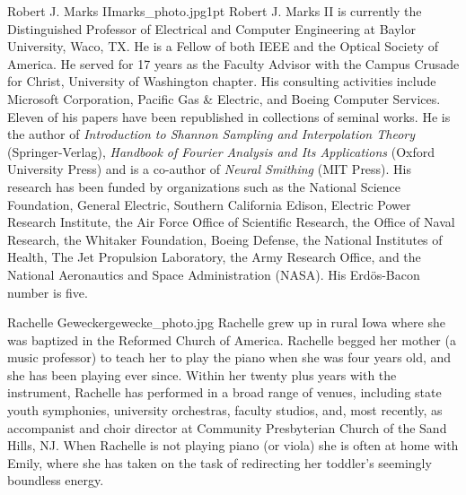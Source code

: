 \begin{authorbio}{Robert J. Marks II}{marks_photo.jpg}{1pt}
Robert J. Marks II is currently the Distinguished Professor of Electrical and Computer Engineering 
at Baylor University, Waco, TX. He is a Fellow of both IEEE and the Optical Society
of America. He served for 17 years as the Faculty Advisor with the Campus Crusade for Christ,
University of Washington chapter. His consulting activities include Microsoft Corporation, Pacific
Gas \& Electric, and Boeing Computer Services. Eleven of his papers have been republished in collections 
of seminal works. He is the author of \textit{Introduction to Shannon Sampling and Interpolation
Theory} (Springer-Verlag), \textit{Handbook of Fourier Analysis and Its Applications} (Oxford University
Press) and is a co-author of \textit{Neural Smithing} (MIT Press). His research has been funded by organizations 
such as the National Science Foundation, General Electric, Southern California Edison,
Electric Power Research Institute, the Air Force Office of Scientific Research, the Office of Naval
Research, the Whitaker Foundation, Boeing Defense, the National Institutes of Health, The Jet
Propulsion Laboratory, the Army Research Office, and the National Aeronautics and Space Administration 
(NASA). 
His Erd\"{o}s-Bacon
number is five.
\end{authorbio}

\begin{authorbio}{Rachelle Gewecke}{rgewecke_photo.jpg}{}
Rachelle grew up in rural Iowa where she was baptized in the Reformed Church of America.  Rachelle begged her mother (a music professor) to teach her to play the piano when she was four years old, and she has been playing ever since.  Within her twenty plus years with the instrument, Rachelle has performed in a broad range of venues, including state youth symphonies, university orchestras, faculty studios, and, most recently, as accompanist and choir director at Community Presbyterian Church of the Sand Hills, NJ.  When Rachelle is not playing piano (or viola) she is often at home with Emily, where she has taken on the task of redirecting her toddler’s seemingly boundless energy.
\end{authorbio}


